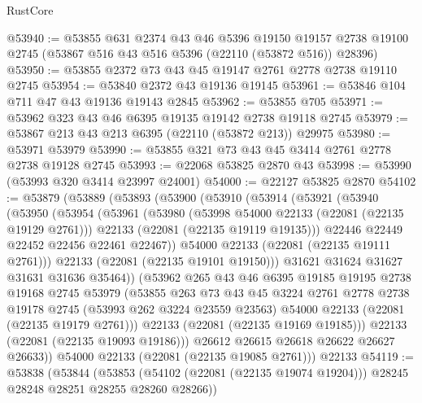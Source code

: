 \begin{lexlean}{RustCore}
\begin{coremodule}
@53940 := @53855
    @631
    @2374
    @43
    @46
    @5396
    @19150
    @19157
    @2738
    @19100
    @2745
    (@53867 @516 @43 @516 @5396 (@22110 (@53872 @516)) @28396)
@53950 := @53855 @2372 @73 @43 @45 @19147 @2761 @2778 @2738 @19110 @2745
@53954 := @53840 @2372 @43 @19136 @19145
@53961 := @53846 @104 @711 @47 @43 @19136 @19143 @2845
@53962 := @53855 @705
@53971 := @53962 @323 @43 @46 @6395 @19135 @19142 @2738 @19118 @2745
@53979 := @53867 @213 @43 @213 @6395 (@22110 (@53872 @213)) @29975
@53980 := @53971 @53979
@53990 := @53855 @321 @73 @43 @45 @3414 @2761 @2778 @2738 @19128 @2745
@53993 := @22068 @53825 @2870 @43
@53998 := @53990 (@53993 @320 @3414 @23997 @24001)
@54000 := @22127 @53825 @2870
@54102 := @53879
    (@53889
      (@53893
        (@53900
          (@53910
            (@53914
              (@53921
                (@53940
                  (@53950
                    (@53954
                      (@53961
                        (@53980
                          (@53998 @54000 @22133 (@22081 (@22135 @19129 @2761)))
                          @22133
                          (@22081 (@22135 @19119 @19135)))
                        @22446
                        @22449
                        @22452
                        @22456
                        @22461
                        @22467))
                    @54000
                    @22133
                    (@22081 (@22135 @19111 @2761)))
                  @22133
                  (@22081 (@22135 @19101 @19150)))
                @31621
                @31624
                @31627
                @31631
                @31636
                @35464))
            (@53962
              @265
              @43
              @46
              @6395
              @19185
              @19195
              @2738
              @19168
              @2745
              @53979
              (@53855
                @263
                @73
                @43
                @45
                @3224
                @2761
                @2778
                @2738
                @19178
                @2745
                (@53993 @262 @3224 @23559 @23563)
                @54000
                @22133
                (@22081 (@22135 @19179 @2761)))
              @22133
              (@22081 (@22135 @19169 @19185)))
            @22133
            (@22081 (@22135 @19093 @19186)))
          @26612
          @26615
          @26618
          @26622
          @26627
          @26633))
      @54000
      @22133
      (@22081 (@22135 @19085 @2761)))
    @22133
@54119 := @53838
    (@53844
      (@53853 (@54102 (@22081 (@22135 @19074 @19204))) @28245 @28248 @28251 @28255 @28260 @28266))

\end{coremodule}
\end{lexlean}
